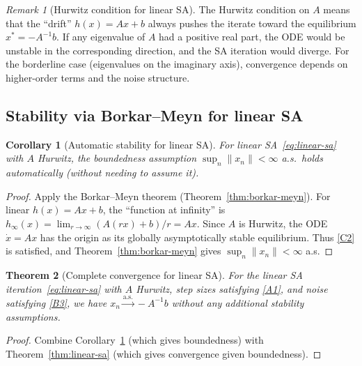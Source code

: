 \documentclass[11pt,a4paper]{article}
\theoremstyle{definition}
\theoremstyle{plain}
\newtheorem{theorem}{Theorem}[section]
\newtheorem{corollary}[theorem]{Corollary}
\theoremstyle{remark}
\newtheorem{remark}{Remark}[section]
\newcommand{\cas}{\xrightarrow{\text{a.s.}}}
\begin{document}
\begin{remark}[Hurwitz condition for linear SA]
\label{rem:hurwitz-intuition}
The Hurwitz condition on $A$ means that the ``drift'' $h(x) = Ax + b$ always pushes
the iterate toward the equilibrium $x^* = -A^{-1}b$. If any eigenvalue of $A$ had
a positive real part, the ODE would be unstable in the corresponding direction, and
the SA iteration would diverge. For the borderline case (eigenvalues on the imaginary
axis), convergence depends on higher-order terms and the noise structure.
\end{remark}

\subsection{Stability via Borkar--Meyn for linear SA}

\begin{corollary}[Automatic stability for linear SA]
\label{cor:linear-stability}
For linear SA~\eqref{eq:linear-sa} with $A$ Hurwitz, the boundedness assumption
$\sup_n \|x_n\| < \infty$ a.s.\ holds automatically (without needing to assume it).
\end{corollary}

\begin{proof}
Apply the Borkar--Meyn theorem (Theorem~\ref{thm:borkar-meyn}). For linear $h(x) = Ax + b$,
the ``function at infinity'' is $h_\infty(x) = \lim_{r \to \infty} (A(rx) + b)/r = Ax$.
Since $A$ is Hurwitz, the ODE $\dot{x} = Ax$ has the origin as its globally
asymptotically stable equilibrium. Thus \ref{C2} is satisfied, and
Theorem~\ref{thm:borkar-meyn} gives $\sup_n \|x_n\| < \infty$ a.s.
\end{proof}

\begin{theorem}[Complete convergence for linear SA]
\label{thm:linear-sa-complete}
For the linear SA iteration~\eqref{eq:linear-sa} with $A$ Hurwitz, step sizes
satisfying \ref{A1}, and noise satisfying \ref{B3}, we have $x_n \cas -A^{-1}b$
without any additional stability assumptions.
\end{theorem}

\begin{proof}
Combine Corollary~\ref{cor:linear-stability} (which gives boundedness) with
Theorem~\ref{thm:linear-sa} (which gives convergence given boundedness).
\end{proof}
\end{document}
